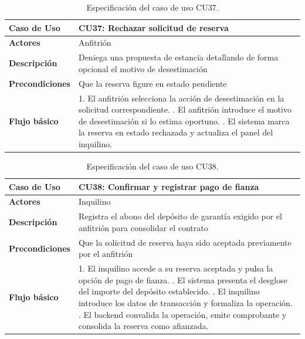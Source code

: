 \begin{table}[H]
\centering
\begin{tabular}{|p{3.2cm}|p{11.3cm}|}
\hline
\textbf{Caso de Uso} & \textbf{CU37: Rechazar solicitud de reserva} \\ \hline
\textbf{Actores} & Anfitrión \\ \hline
\textbf{Descripción} & Deniega una propuesta de estancia detallando de forma opcional el motivo de desestimación \\ \hline
\textbf{Precondiciones} & Que la reserva figure en estado pendiente \\ \hline
\textbf{Flujo básico} & 
1. El anfitrión selecciona la acción de desestimación en la solicitud correspondiente. \newline
2. El anfitrión introduce el motivo de desestimación si lo estima oportuno. \newline
3. El sistema marca la reserva en estado rechazada y actualiza el panel del inquilino. \\ \hline
\end{tabular}
\caption{Especificación del caso de uso CU37.}
\label{tab:cu37}
\end{table}

\begin{table}[H]
\centering
\begin{tabular}{|p{3.2cm}|p{11.3cm}|}
\hline
\textbf{Caso de Uso} & \textbf{CU38: Confirmar y registrar pago de fianza} \\ \hline
\textbf{Actores} & Inquilino \\ \hline
\textbf{Descripción} & Registra el abono del depósito de garantía exigido por el anfitrión para consolidar el contrato \\ \hline
\textbf{Precondiciones} & Que la solicitud de reserva haya sido aceptada previamente por el anfitrión \\ \hline
\textbf{Flujo básico} & 
1. El inquilino accede a su reserva aceptada y pulsa la opción de pago de fianza. \newline
2. El sistema presenta el desglose del importe del depósito establecido. \newline
3. El inquilino introduce los datos de transacción y formaliza la operación. \newline
4. El backend convalida la operación, emite comprobante y consolida la reserva como afianzada. \\ \hline
\end{tabular}
\caption{Especificación del caso de uso CU38.}
\label{tab:cu38}
\end{table}